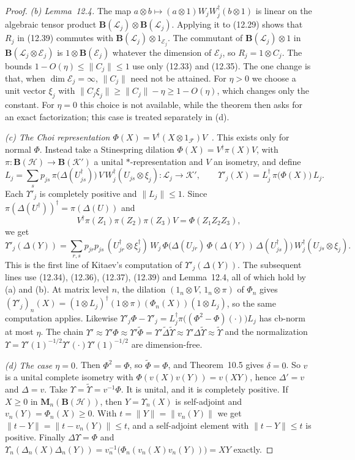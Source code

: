 \documentclass[11pt]{article}
\theoremstyle{remark}
\newcommand{\cH}{\mathcal{H}}
\newcommand{\cK}{\mathcal{K}}
\newcommand{\cL}{\mathcal{L}}
\newcommand{\cE}{\mathcal{E}}
\newcommand{\Bo}{\mathbf{B}}
\newcommand{\wt}{\widetilde}
\newcommand{\Ma}[1]{\mathbf{M}_{#1}}
\begin{document}
\begin{proof}
\emph{(b) Lemma~12.4.} The map $a\otimes b\mapsto(a\otimes1)W_jW_j^\dagger(b\otimes1)$ is linear on the algebraic tensor product $\Bo(\cL_j)\otimes\Bo(\cL_j)$. Applying it to (12.29) shows that $R_j$ in (12.39) commutes with $\Bo(\cL_j)\otimes1_{\cE_j}$. The commutant of $\Bo(\cL_j)\otimes1$ in $\Bo(\cL_j\otimes\cE_j)$ is $1\otimes\Bo(\cE_j)$ whatever the dimension of $\cE_j$, so $R_j=1\otimes C_j$. The bounds $1-O(\eta)\le\|C_j\|\le1$ use only (12.33) and (12.35). The one change is that, when $\dim\cE_j=\infty$, $\|C_j\|$ need not be attained. For $\eta>0$ we choose a unit vector $\xi_j$ with $\|C_j\xi_j\|\ge\|C_j\|-\eta\ge1-O(\eta)$, which changes only the constant. For $\eta=0$ this choice is not available, while the theorem then asks for an exact factorization; this case is treated separately in (d).

\emph{(c) The Choi representation $\Phi(X)=V^\dagger(X\otimes1_\mathcal{F})V$~\cite{Choi}.} This exists only for normal $\Phi$. Instead take a Stinespring dilation $\Phi(X)=V^\dagger\pi(X)V$, with $\pi\colon\Bo(\cH)\to\Bo(\cK')$ a unital $*$-representation and $V$ an isometry, and define
\[
L_j=\sum_sp_{js}\,\pi\bigl(\Delta(U_{js}^\dagger)\bigr)\,V\,W_j^\dagger(U_{js}\otimes\xi_j)\colon\cL_j\to\cK',\qquad
\Upsilon'_j(X)=L_j^\dagger\,\pi\bigl(\Phi(X)\bigr)\,L_j .
\]
Each $\Upsilon'_j$ is completely positive and $\|L_j\|\le1$. Since $\pi(\Delta(U^\dagger))^\dagger=\pi(\Delta(U))$ and
\[
V^\dagger\pi(Z_1)\pi(Z_2)\pi(Z_3)V=\Phi(Z_1Z_2Z_3),
\]
we get
\[
\Upsilon'_j(\Delta(Y))=\sum_{r,s}p_{jr}p_{js}\,(U_{jr}^\dagger\otimes\xi_j^\dagger)\,W_j\,
\Phi\bigl(\Delta(U_{jr})\,\Phi(\Delta(Y))\,\Delta(U_{js}^\dagger)\bigr)\,W_j^\dagger(U_{js}\otimes\xi_j).
\]
This is the first line of Kitaev's computation of $\Upsilon'_j(\Delta(Y))$. The subsequent lines use (12.34), (12.36), (12.37), (12.39) and Lemma~12.4, all of which hold by (a) and (b). At matrix level $n$, the dilation $(1_n\otimes V,\,1_n\otimes\pi)$ of $\Phi_n$ gives $(\Upsilon'_j)_n(X)=(1\otimes L_j)^\dagger(1\otimes\pi)(\Phi_n(X))(1\otimes L_j)$, so the same computation applies. Likewise $\Upsilon'_j\Phi-\Upsilon'_j=L_j^\dagger\pi\bigl((\Phi^2-\Phi)(\cdot)\bigr)L_j$ has cb-norm at most $\eta$. The chain $\Upsilon'\approx\Upsilon'\Phi\approx\Upsilon'\wt\Phi=\Upsilon'\wt\Delta\wt\Upsilon\approx\Upsilon'\Delta\wt\Upsilon\approx\wt\Upsilon$ and the normalization $\Upsilon=\Upsilon'(1)^{-1/2}\Upsilon'(\cdot)\Upsilon'(1)^{-1/2}$ are dimension-free.

\emph{(d) The case $\eta=0$.} Then $\Phi^2=\Phi$, so $\wt\Phi=\Phi$, and Theorem~10.5 gives $\delta=0$. So $v$ is a unital complete isometry with $\Phi(v(X)v(Y))=v(XY)$, hence $\Delta'=v$ and $\Delta=v$. Take $\Upsilon=\wt\Upsilon=v^{-1}\Phi$. It is unital, and it is completely positive. If $X\ge0$ in $\Ma{n}(\Bo(\cH))$, then $Y=\Upsilon_n(X)$ is self-adjoint and $v_n(Y)=\Phi_n(X)\ge0$. With $t=\|Y\|=\|v_n(Y)\|$ we get $\|t-Y\|=\|t-v_n(Y)\|\le t$, and a self-adjoint element with $\|t-Y\|\le t$ is positive. Finally $\Delta\Upsilon=\Phi$ and $\Upsilon_n(\Delta_n(X)\Delta_n(Y))=v_n^{-1}\bigl(\Phi_n(v_n(X)v_n(Y))\bigr)=XY$ exactly.
\end{proof}
\end{document}
